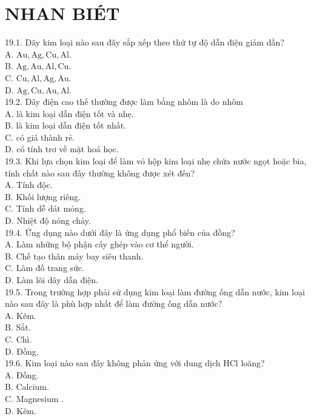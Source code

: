 \documentclass[10pt]{article}
\begin{document}
\section*{NHAN BIÉT}
19.1. Dãy kim loại nào sau đây sắp xếp theo thứ tự độ dẫn điện giảm dần?\\
A. $\mathrm{Au}, \mathrm{Ag}, \mathrm{Cu}, \mathrm{Al}$.\\
B. $\mathrm{Ag}, \mathrm{Au}, \mathrm{Al}, \mathrm{Cu}$.\\
C. $\mathrm{Cu}, \mathrm{Al}, \mathrm{Ag}, \mathrm{Au}$.\\
D. $\mathrm{Ag}, \mathrm{Cu}, \mathrm{Au}, \mathrm{Al}$.\\
19.2. Dây điện cao thế thường được làm bằng nhôm là do nhôm\\
A. là kim loại dẫn điện tốt và nhẹ.\\
B. là kim loại dẫn điện tốt nhất.\\
C. có giá thành rẻ.\\
D. có tính trơ về mặt hoá học.\\
19.3. Khi lựa chọn kim loại để làm vỏ hộp kim loại nhẹ chứa nước ngọt hoặc bia, tính chất nào sau đây thường không được xét đến?\\
A. Tính độc.\\
B. Khối lượng riêng.\\
C. Tính dễ dát mỏng.\\
D. Nhiệt độ nóng chảy.\\
19.4. Ứng dụng nào dưới đây là ứng dụng phổ biến của đồng?\\
A. Làm những bộ phận cấy ghép vào cơ thể người.\\
B. Chế tạo thân máy bay siêu thanh.\\
C. Làm đồ trang sức.\\
D. Làm lõi dây dẫn điện.\\
19.5. Trong trường hợp phải sử dụng kim loại làm đường ống dẫn nước, kim loại nào sau đây là phù hợp nhất để làm đường ống dẫn nước?\\
A. Kẽm.\\
B. Sắt.\\
C. Chì.\\
D. Đồng.\\
19.6. Kim loại nào sau đây không phản ứng với dung dịch HCl loãng?\\
A. Đồng.\\
B. Calcium.\\
C. Magnesium .\\
D. Kẽm.
\end{document}
